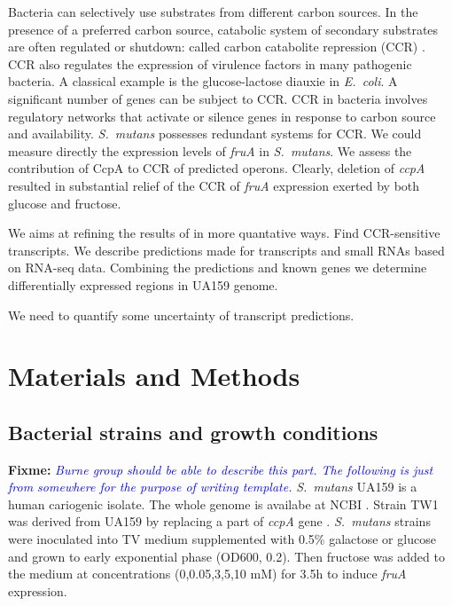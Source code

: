 \documentclass{article}
\newcommand{\fixme}[1]{{\textbf{Fixme:} \textit{\textcolor{blue}{#1}}}}
\begin{document}
Bacteria can selectively use substrates from different carbon sources. In the
presence of a preferred carbon source, catabolic system of secondary substrates
are often regulated or shutdown: called carbon catabolite repression (CCR)
\cite{Gorke2008}. CCR also regulates the expression of virulence factors in many
pathogenic bacteria. A classical example is the glucose-lactose diauxie in
\textit{E.\ coli}. A significant number of genes can be subject to CCR.  CCR in
bacteria involves regulatory networks that activate or silence genes in response
to carbon source and availability.  \textit{S.\ mutans} possesses redundant
systems for CCR.  We could measure directly the expression levels of
\textit{fruA} in \textit{S.\ mutans}.  We assess the contribution of CcpA to CCR
of predicted operons.  Clearly, deletion of \textit{ccpA} resulted in
substantial relief of the CCR of \textit{fruA} expression exerted by both
glucose and fructose.

We aims at refining the results of \cite{Abranches2008} in more quantative ways.
Find CCR-sensitive transcripts. We describe predictions made for transcripts and
small RNAs based on RNA-seq data. Combining the predictions and known genes we
determine differentially expressed regions in UA159 genome. 

We need to quantify some uncertainty of transcript predictions.

\section{Materials and Methods}

\subsection{Bacterial strains and growth conditions}
\fixme{Burne group should be able to describe this part. The following is just
from somewhere for the purpose of writing template.}
\textit{S.\ mutans} UA159 is a human cariogenic isolate. The whole genome is
availabe at NCBI \cite{Ajdic2002}. Strain TW1 was derived from UA159 by
replacing a part of \textit{ccpA} gene \cite{Wen2002}.  \textit{S.\ mutans}
strains were inoculated into TV medium supplemented with 0.5\% galactose or
glucose and grown to early exponential phase (OD600, 0.2).  Then fructose was
added to the medium at concentrations (0,0.05,3,5,10 mM) for 3.5h to induce
\textit{fruA} expression.
\end{document}
